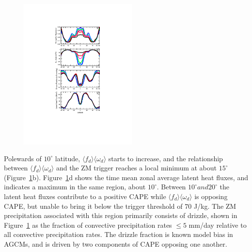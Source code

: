 \begin{figure}[t]
\begin{center}
\noindent\includegraphics[width=14pc,angle=0]{chapter6/temp_zonal_4reg_dwn.pdf}\\
\end{center}
\caption{}
\label{fig:4reg}
\end{figure}

Polewards of $10^{\circ}$ latitude, $\langle f_{d} \rangle \langle \omega_{d} \rangle$ starts to increase, and the relationship between $\langle f_{d} \rangle \langle \omega_{d} \rangle$ and the ZM trigger reaches a local minimum at about $15^{\circ}$ (Figure~\ref{fig:4reg}b). Figure~\ref{fig:4reg}d shows the time mean zonal average latent heat fluxes, and indicates a maximum in the same region, about $10^{\circ}$. Between $10^{\circ} and 20^{\circ}$ the latent heat fluxes contribute to a positive CAPE while $\langle f_{d} \rangle \langle \omega_{d} \rangle$ is opposing CAPE, but unable to bring it below the trigger threshold of $70$ J/kg. The ZM precipitation associated with this region primarily consists of drizzle, shown in Figure~\ref{fig:4reg} as the fraction of convective precipitation rates $\leq 5$ mm/day relative to all convective precipitation rates. The drizzle fraction is known model bias in AGCMs, and is driven by two components of CAPE opposing one another. 

